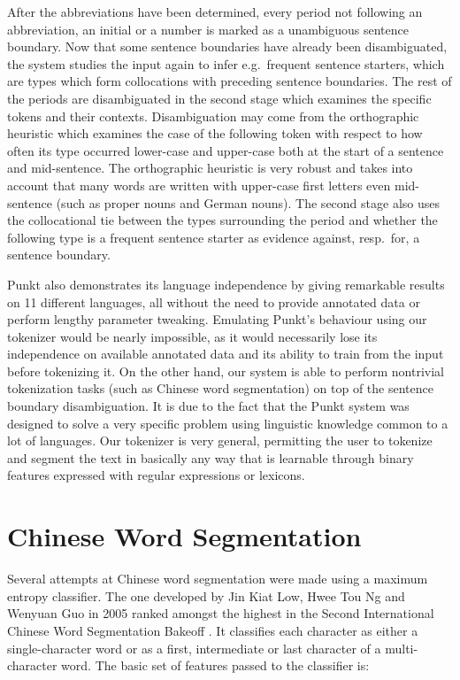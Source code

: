 After the abbreviations have been determined, every period not following an
abbreviation, an initial or a number is marked as a unambiguous sentence
boundary. Now that some sentence boundaries have already been disambiguated,
the system studies the input again to infer e.g.\ frequent sentence starters,
which are types which form collocations with preceding sentence boundaries. The
rest of the periods are disambiguated in the second stage which examines the
specific tokens and their contexts. Disambiguation may come from the
orthographic heuristic which examines the case of the following token with
respect to how often its type occurred lower-case and upper-case both at the
start of a sentence and mid-sentence. The orthographic heuristic is very robust
and takes into account that many words are written with upper-case first
letters even mid-sentence (such as proper nouns and German nouns). The second
stage also uses the collocational tie between the types surrounding the period
and whether the following type is a frequent sentence starter as evidence
against, resp.\ for, a sentence boundary.

Punkt also demonstrates its language independence by giving remarkable results
on 11 different languages, all without the need to provide annotated data or
perform lengthy parameter tweaking. Emulating Punkt's behaviour using our
tokenizer would be nearly impossible, as it would necessarily lose its
independence on available annotated data and its ability to train from the
input before tokenizing it. On the other hand, our system is able to perform
nontrivial tokenization tasks (such as Chinese word segmentation) on top of the
sentence boundary disambiguation. It is due to the fact that the Punkt system
was designed to solve a very specific problem using linguistic knowledge common
to a lot of languages. Our tokenizer is very general, permitting the user to
tokenize and segment the text in basically any way that is learnable through
binary features expressed with regular expressions or lexicons.

\section{Chinese Word Segmentation}
\label{survey-chinese}

Several attempts at Chinese word segmentation were made using a maximum entropy
classifier. The one developed by Jin Kiat Low, Hwee Tou Ng and Wenyuan Guo in
2005 \cite{seg-chinese-maxent} ranked amongst the highest in the Second
International Chinese Word Segmentation Bakeoff \cite{web-bakeoff}. It
classifies each character as either a single-character word or as a first,
intermediate or last character of a multi-character word. The basic set of
features passed to the classifier is:

